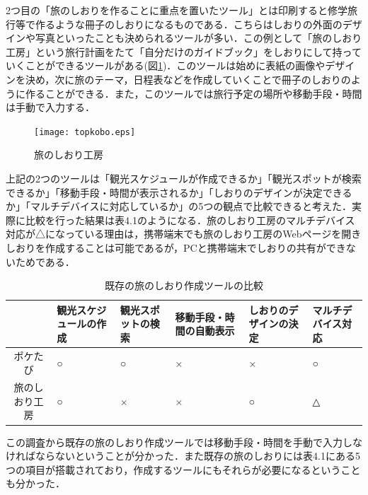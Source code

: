 \documentclass{funthesis}
\begin{document}
2つ目の「旅のしおりを作ることに重点を置いたツール」とは印刷すると修学旅行等で作るような冊子のしおりになるものである．こちらはしおりの外面のデザインや写真といったことも決められるツールが多い．この例として「旅のしおり工房」\cite{tripkobo}という旅行計画をたて「自分だけのガイドブック」をしおりにして持っていくことができるツールがある(図\ref{Ltopkobo})．このツールは始めに表紙の画像やデザインを決め，次に旅のテーマ，日程表などを作成していくことで冊子のしおりのように作ることができる．また，このツールでは旅行予定の場所や移動手段・時間は手動で入力する．

\begin{figure}[htpb]
\begin{center}
\texttt{[image: topkobo.eps]}
\end{center}
\caption{旅のしおり工房}
\label{Ltopkobo}
\end{figure}

上記の2つのツールは「観光スケジュールが作成できるか」「観光スポットが検索できるか」「移動手段・時間が表示されるか」「しおりのデザインが決定できるか」「マルチデバイスに対応しているか」の5つの観点で比較できると考えた．実際に比較を行った結果は表4.1のようになる．旅のしおり工房のマルチデバイス対応が△になっている理由は，携帯端末でも旅のしおり工房のWebページを開きしおりを作成することは可能であるが，PCと携帯端末でしおりの共有ができないためである．


\begin{table}[htb]
\begin{center}
\caption{既存の旅のしおり作成ツールの比較}
  \begin{tabular}{|c|p{2.0cm}|p{2.0cm}|p{2.0cm}|p{2.0cm}|p{2.0cm}|} \hline
     & 観光スケジュールの作成 & 観光スポットの検索 & 移動手段・時間の自動表示 & しおりのデザインの決定 & マルチデバイス対応 \\ \hline 
    ポケたび & ○ & ○ & × & × & ○ \\ \hline
    旅のしおり工房 & ○ & × & × & ○ & △\\ \hline
  \end{tabular}
  \end{center}
\end{table}


この調査から既存の旅のしおり作成ツールでは移動手段・時間を手動で入力しなければならないということが分かった．また既存の旅のしおりには表4.1にある5つの項目が搭載されており，作成するツールにもそれらが必要になるということも分かった．\\
\end{document}
